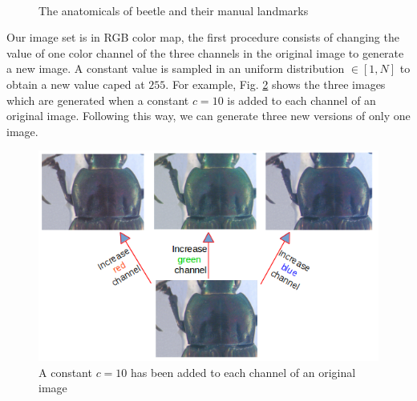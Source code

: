 \documentclass[review]{elsarticle}
\begin{document}
\begin{figure}[htbp]
	~~	
	~~
 \\
    \caption{The anatomicals of beetle and their manual landmarks}
    \label{figbeetles}
\end{figure}
\fi

Our image set is in RGB color map, the first procedure consists of changing the value of one color channel of the three channels in the original image to generate a new image. A constant value is sampled in an uniform distribution $\in [1, N]$ to obtain a new value caped at $255$. For example, Fig. \ref{figaug1} shows the three images which are generated  when a constant $c = 10$ is added to each channel of an original image. Following this way, we can generate three new versions of only one image.

\begin{figure}[h]
	\centering
	\includegraphics[scale=0.4]{images/inc_channels}
	\caption{A constant $c = 10$ has been added to each channel of an original image}
	\label{figaug1}
\end{figure}
\end{document}
